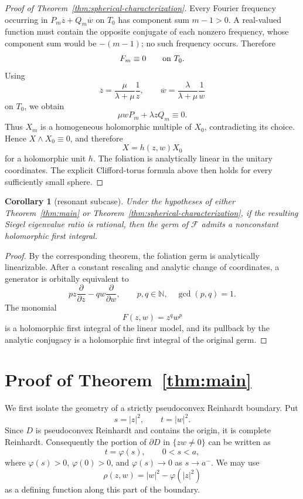 \documentclass[11pt,reqno]{article}
\newtheorem{corollary}{Corollary}
\theoremstyle{remark}
\newcommand{\F}{\mathcal F}
\newcommand{\pd}{\partial}
\newcommand{\ol}{\overline}
\begin{document}
\begin{proof}[Proof of Theorem~\ref{thm:spherical-characterization}]
Every Fourier frequency occurring in $P_m\ol z+Q_m\ol w$ on $T_0$ has component sum $m-1>0$. A real-valued function must contain the opposite conjugate of each nonzero frequency, whose component sum would be $-(m-1)$; no such frequency occurs. Therefore
\[
 F_m\equiv0\qquad\hbox{on }T_0.
\]
Using
\[
 \ol z=\frac{\mu}{\lambda+\mu}\frac1z,
 \qquad
 \ol w=\frac{\lambda}{\lambda+\mu}\frac1w
\]
on $T_0$, we obtain
\[
 \mu wP_m+\lambda zQ_m\equiv0.
\]
Thus $X_m$ is a homogeneous holomorphic multiple of $X_0$, contradicting its choice. Hence $X\wedge X_0\equiv0$, and therefore
\[
 X=h(z,w)X_0
\]
for a holomorphic unit $h$. The foliation is analytically linear in the unitary coordinates. The explicit Clifford-torus formula above then holds for every sufficiently small sphere.
\end{proof}

\begin{corollary}[resonant subcase]\label{cor:resonant-first-integral}
Under the hypotheses of either Theorem~\ref{thm:main} or Theorem~\ref{thm:spherical-characterization}, if the resulting Siegel eigenvalue ratio is rational, then the germ of $\F$ admits a nonconstant holomorphic first integral.
\end{corollary}

\begin{proof}
By the corresponding theorem, the foliation germ is analytically linearizable. After a constant rescaling and analytic change of coordinates, a generator is orbitally equivalent to
\[
 pz\frac{\pd}{\pd z}-qw\frac{\pd}{\pd w},
 \qquad p,q\in\mathbb N,\quad \gcd(p,q)=1.
\]
The monomial
\[
 F(z,w)=z^q w^p
\]
is a holomorphic first integral of the linear model, and its pullback by the analytic conjugacy is a holomorphic first integral of the original germ.
\end{proof}












\section{Proof of Theorem~\ref{thm:main}}

We first isolate the geometry of a strictly pseudoconvex Reinhardt boundary. Put
\[
 s=|z|^2,\qquad t=|w|^2.
\]
Since $D$ is pseudoconvex Reinhardt and contains the origin, it is complete Reinhardt. Consequently the portion of $\partial D$ in $\{zw\neq0\}$ can be written as
\begin{equation}\label{eq:reinhardt-profile}
 t=\varphi(s),\qquad 0<s<a,
\end{equation}
where $\varphi(s)>0$, $\varphi(0)>0$, and $\varphi(s)\to0$ as $s\to a^-$. We may use
\[
 \rho(z,w)=|w|^2-\varphi(|z|^2)
\]
as a defining function along this part of the boundary.
\end{document}
